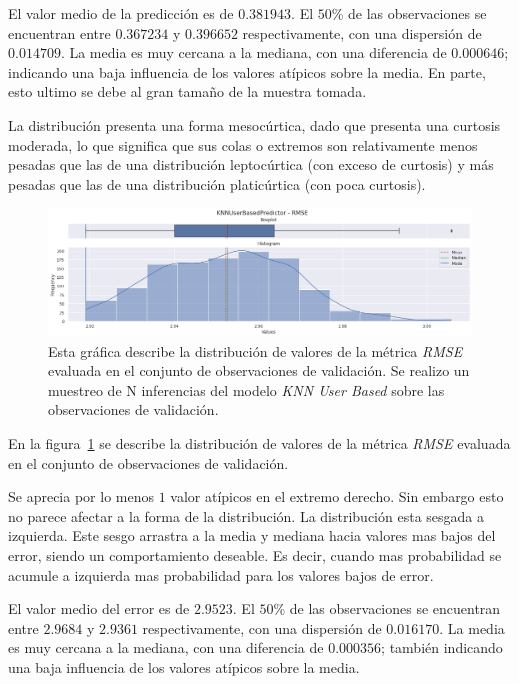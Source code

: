 \documentclass[11pt,a4paper,twoside]{thesis}
\begin{document}
El valor medio de la predicción es de $0.381943$. El $50$\% de las
observaciones se encuentran entre $0.367234$ y $0.396652$ respectivamente, con
una dispersión de $0.014709$. La media es muy cercana a la mediana, con una
diferencia de $0.000646$; indicando una baja influencia de los valores atípicos
sobre la media. En parte, esto ultimo se debe al gran tamaño de la muestra
tomada.

La distribución presenta una forma mesocúrtica, dado que presenta una curtosis
moderada, lo que significa que sus colas o extremos son relativamente menos
pesadas que las de una distribución leptocúrtica (con exceso de curtosis) y más
pesadas que las de una distribución platicúrtica (con poca curtosis).

\begin{figure}[!htb]
	\centering
	\includegraphics[width=15cm]{./images/metrics-knn-user-based-RMSE.png}
	\caption{
		Esta gráfica describe la distribución de valores de la métrica
		\textit{RMSE} evaluada en el conjunto de observaciones de
		validación. Se realizo un muestreo de N inferencias del modelo
		\textit{KNN User Based} sobre las observaciones de validación.
	}
	\label{fig:knnUserRMSE}
\end{figure}

En la figura~\ref{fig:knnUserRMSE} se describe la distribución de valores de la
métrica \textit{RMSE} evaluada en el conjunto de observaciones de validación.

Se aprecia por lo menos $1$ valor atípicos en el extremo derecho. Sin embargo
esto no parece afectar a la forma de la distribución. La distribución esta
sesgada a izquierda. Este sesgo arrastra a la media y mediana hacia valores mas
bajos del error, siendo un comportamiento deseable. Es decir, cuando mas
probabilidad se acumule a izquierda mas probabilidad para los valores bajos de
error.

El valor medio del error es de $2.9523$. El $50$\% de las observaciones se
encuentran entre $2.9684$ y $2.9361$ respectivamente, con una dispersión de
$0.016170$. La media es muy cercana a la mediana, con una diferencia de
$0.000356$; también indicando una baja influencia de los valores atípicos sobre
la media.
\end{document}

